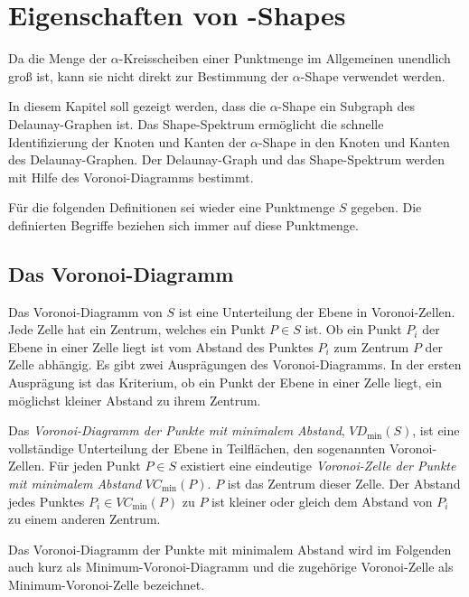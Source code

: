 
\chapter{Eigenschaften von \boldmath{$\alpha$}-Shapes}\label{alpha_props}

Da die Menge der $\alpha$-Kreisscheiben einer Punktmenge im Allgemeinen unendlich groß ist, kann sie nicht direkt zur Bestimmung der $\alpha$-Shape verwendet werden.

In diesem Kapitel soll gezeigt werden, dass die $\alpha$-Shape ein Subgraph des Delaunay-Graphen ist. Das Shape-Spektrum ermöglicht die schnelle Identifizierung der Knoten und Kanten der $\alpha$-Shape in den Knoten und Kanten des Delaunay-Graphen. Der Delaunay-Graph und das Shape-Spektrum werden mit Hilfe des \- Voronoi-Diagramms bestimmt.

Für die folgenden Definitionen sei wieder eine Punktmenge $S$ gegeben. Die definierten Begriffe beziehen sich immer auf diese Punktmenge.

\section{Das Voronoi-Diagramm}

Das Voronoi-Diagramm von $S$ ist eine Unterteilung der Ebene in Voronoi-Zellen. Jede Zelle hat ein Zentrum, welches ein Punkt $P \in S$ ist. Ob ein Punkt $P_i$ der Ebene in einer Zelle liegt ist vom Abstand des Punktes $P_i$ zum Zentrum $P$ der Zelle abhängig. Es gibt zwei Ausprägungen des Voronoi-Diagramms. In der ersten Ausprägung ist das Kriterium, ob ein Punkt der Ebene in einer Zelle liegt, ein möglichst kleiner Abstand zu ihrem Zentrum.

\begin{defin}
Das \emph{Voronoi-Diagramm \- der \- Punkte \- mit \- minimalem \- Abstand}, \- $VD_{\min}(S)$, \- ist eine vollständige Unterteilung der Ebene in Teilflächen, den sogenannten Voronoi-Zellen. Für jeden Punkt $P \in S$ existiert eine eindeutige \emph{Voronoi-Zelle der Punkte mit minimalem Abstand} $VC_{\min}(P)$. $P$ ist das Zentrum dieser Zelle. Der Abstand jedes Punktes $P_i \in VC_{\min}(P)$ zu $P$ ist kleiner oder gleich dem Abstand von $P_i$ zu einem anderen Zentrum.
\end{defin}

Das Voronoi-Diagramm der Punkte mit minimalem Abstand wird im Folgenden auch kurz als Minimum-Voronoi-Diagramm und die zugehörige Voronoi-Zelle als Minimum-Voronoi-Zelle bezeichnet.

